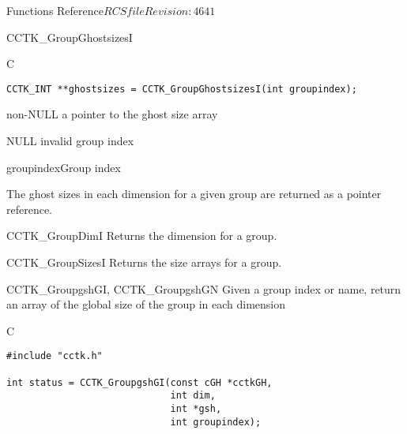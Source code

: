 \begin{cactuspart}{ Functions Reference}{$RCSfile$}{$Revision: 4641 $}
\begin{FunctionDescription}{CCTK\_GroupGhostsizesI}
\begin{SynopsisSection}
\begin{Synopsis}{C}
\begin{verbatim}
CCTK_INT **ghostsizes = CCTK_GroupGhostsizesI(int groupindex);
\end{verbatim}
\end{Synopsis}
\end{SynopsisSection}

\begin{ResultSection}
\begin{Result}{non-NULL} a pointer to the ghost size array\end{Result}
\begin{Result}{NULL} invalid group index \end{Result}
\end{ResultSection}

\begin{ParameterSection}
\begin{Parameter}{groupindex}Group index\end{Parameter}
\end{ParameterSection}

\begin{Discussion}
The ghost sizes in each dimension for a given group are returned as a pointer reference.
\end{Discussion}

\begin{SeeAlsoSection}
\begin{SeeAlso}{CCTK\_GroupDimI}
Returns the dimension for a group.
\end{SeeAlso}
\begin{SeeAlso}{CCTK\_GroupSizesI}
Returns the size arrays for a group.
\end{SeeAlso}
\end{SeeAlsoSection}
\end{FunctionDescription}

\begin{FunctionDescription}{CCTK\_GroupgshGI, CCTK\_GroupgshGN}
\label{CCTK-GroupgshGI}
\label{CCTK-GroupgshGN}
Given a group index or name, return an array of the global size of the group in each dimension

\begin{SynopsisSection}
\begin{Synopsis}{C}
\begin{verbatim}
#include "cctk.h"

int status = CCTK_GroupgshGI(const cGH *cctkGH,
                             int dim,
                             int *gsh,
                             int groupindex);


\end{verbatim}
\end{Synopsis}
\end{SynopsisSection}
\end{FunctionDescription}
\end{cactuspart}
